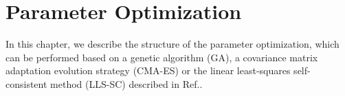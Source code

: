 \documentclass[10pt,a4paper,openany]{memoir}
\numberwithin{equation}{section}
\begin{document}
\chapter{Parameter Optimization}
\label{chap:ga}

%
%
%

In this chapter, we describe the structure of the parameter
optimization, which can be performed based on a genetic algorithm
(GA), a covariance matrix adaptation evolution strategy (CMA-ES) or  
the linear least-squares self-consistent method (LLS-SC) described in
Ref.\cite{PAPER}.

% 
%   
\end{document}
